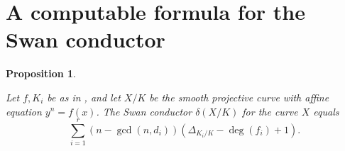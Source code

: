 \documentclass[12pt]{amsart}
\numberwithin{equation}{section}
\newtheorem{prop}[equation]{Proposition}
\theoremstyle{definition}
\newcommand{\padma}[1]{{\color{Magenta} \sf $\clubsuit\clubsuit\clubsuit$ Padma: [#1]}}
\newcommand{\mc}[1]{\mathcal{#1}}
\newcommand{\ints}{\mathbb Z}
\newcommand{\proj}{\mathbb P}
\DeclareMathOperator{\disc}{disc}
\DeclareMathOperator{\cha}{char}
\DeclareMathOperator{\rad}{rad}
\begin{document}
\section{A computable formula for the Swan conductor}\label{Sswan}




\begin{prop}\label{Pswanconductor}

Let $f,K_i$ be as in , and let $X/K$ be the smooth projective curve with affine equation $y^n =
f(x)$. 
The Swan conductor $\delta(X/K)$ for the curve $X$ equals
\[ \sum_{i=1}^r (n - \gcd(n, d_i)) (\Delta_{K_i/K} - \deg(f_i) + 1) .\]
\end{prop}
\end{document}
